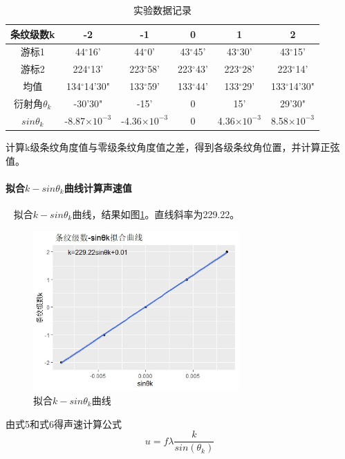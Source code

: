 \documentclass[12pt,a4paper,UTF8]{ctexart}
\begin{document}
\begin{table}[htbp]
	\centering
	\caption{实验数据记录}
	\begin{tabular}{cccccc}
	\toprule
	条纹级数k    & -2 & -1  & 0 & 1 & 2 \\
	\midrule
	游标1     & 44$^{\circ}$16' & 44$^{\circ}$0' & 43$^{\circ}$45'&  43$^{\circ}$30'   & 43$^{\circ}$15'\\
	游标2     & 224$^{\circ}$13' & 223$^{\circ}$58' & 223$^{\circ}$43' & 223$^{\circ}$28' & 223$^{\circ}$14' \\
	均值      & 134$^{\circ}$14'30" & 133$^{\circ}$59' & 133$^{\circ}$44' & 133$^{\circ}$29' & 133$^{\circ}$14'30"\\
	衍射角$\theta_k$    & -30'30" & -15' & 0 & 15' & 29'30" \\
	$sin\theta_k$    &   -8.87$\times 10^{-3}$ & -4.36$\times 10^{-3}$ & 0 &4.36$\times 10^{-3}$ & 8.58$\times 10^{-3}$ \\
	\bottomrule
	\end{tabular}%
	\label{tab:1}%
\end{table}%


		计算k级条纹角度值与零级条纹角度值之差，得到各级条纹角位置，并计算正弦值。
		
		\paragraph{拟合$k-sin\theta_k$曲线计算声速值}~
		\newline
		\indent
		拟合$k-sin\theta_k$曲线，结果如图\ref{fig:1}。直线斜率为229.22。
		\begin{figure}[htbp]
			\centering
			\includegraphics[width=0.7\textwidth]{img//curve1.jpeg}
			\caption{拟合$k-sin\theta_k$曲线}
			\label{fig:1}
		\end{figure}
		
		由式5和式6得声速计算公式
		\begin{equation}\label{eq:5}
			u = f\lambda\frac{k}{sin(\theta_k)}
		\end{equation}
		
\end{document}
